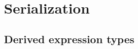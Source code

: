 \chapter{Serialization}
\label{serialization}

\section{Derived expression types}
\label{derivedsection}
